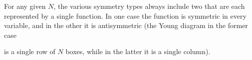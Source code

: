 For any given $N$, the various symmetry types always include two that are each represented by a single function. In one case the function is symmetric in every variable, and in the other it is antisymmetric (the Young diagram in the former case

is a single row of $N$ boxes, while in the latter it is a single column).
